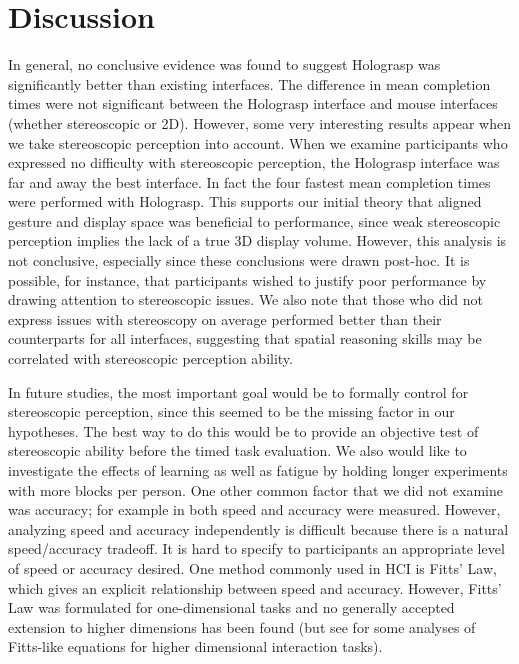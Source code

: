 \documentclass[pageno]{jpaper}
\begin{document}
\section{Discussion}
In general, no conclusive evidence was found to suggest Holograsp was significantly better than existing interfaces. The difference in mean
completion times were not significant between the Holograsp interface and mouse interfaces (whether stereoscopic or 2D). However, some very
interesting results appear when we take stereoscopic perception into account. When we examine participants who expressed no difficulty with
stereoscopic perception, the Holograsp interface was far and away the best interface. In fact the four fastest mean completion times were
performed with Holograsp. This supports our initial theory that aligned gesture and display space was beneficial to performance, since weak
stereoscopic perception implies the lack of a true 3D display volume. However, this analysis is not conclusive, especially since these conclusions
were drawn post-hoc. It is possible, for instance, that participants wished to justify poor performance by drawing attention to stereoscopic issues.
We also note that those who did not express issues with stereoscopy on average performed better than their counterparts for all interfaces, suggesting
that spatial reasoning skills may be correlated with stereoscopic perception ability.

In future studies, the most important goal would be to formally
control for stereoscopic perception, since this seemed to be the missing factor in our hypotheses. The best way to do this
would be to provide an objective test of stereoscopic ability before the timed task evaluation. We also
would like to investigate the effects of learning as well as fatigue by holding longer experiments with
more blocks per person. One other common factor that we did not examine was accuracy; for example in \cite{study1}
both speed and accuracy were measured. However, analyzing speed and accuracy independently is difficult because
there is a natural speed/accuracy tradeoff. It is hard to specify to participants an appropriate level of speed
or accuracy desired. One method commonly used in HCI is Fitts' Law, which gives an explicit relationship between
speed and accuracy. However, Fitts' Law was formulated for one-dimensional tasks and no generally accepted extension
to higher dimensions has been found (but see \cite{mackenzie1992extending, monk1985fitts, murata2001extending} for some analyses of Fitts-like equations for higher
dimensional interaction tasks). 
\end{document}
